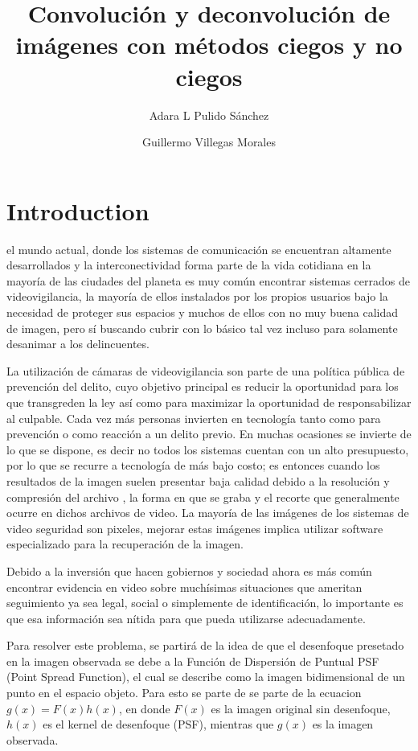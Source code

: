 \documentclass[eng]{ajceam-class}
\title{Convolución y deconvolución de imágenes con métodos ciegos y no ciegos}
\author[1]{Adara L Pulido Sánchez}
\author[2]{Guillermo Villegas Morales}
\affil[1]{Tecnologico de Monterrey, Escuela de Ingenieria y Ciencias}
\begin{document}
\maketitle
\thispagestyle{fancy}


\section{Introduction}
el mundo actual, donde los sistemas de comunicación se encuentran altamente desarrollados y la interconectividad forma parte de la vida cotidiana en la mayoría de las ciudades del planeta es muy común encontrar sistemas cerrados de videovigilancia, la mayoría  de ellos instalados por los propios usuarios bajo la necesidad de proteger sus espacios y muchos de ellos con no muy buena calidad de imagen, pero sí buscando cubrir con lo básico tal vez incluso para solamente desanimar a los delincuentes.

 La utilización de cámaras de videovigilancia son parte de una política pública de prevención del delito, cuyo objetivo principal es reducir la oportunidad para los que transgreden la ley así como para maximizar la oportunidad de responsabilizar al culpable. 
 Cada vez más personas invierten en tecnología tanto como para prevención o como reacción a un delito previo. En muchas ocasiones se invierte de lo que se dispone, es decir no todos los sistemas cuentan con un alto presupuesto, por lo que se recurre a tecnología de más bajo costo; es entonces cuando los resultados de la imagen suelen presentar baja calidad debido a la resolución y compresión del archivo , la forma en que se graba y el recorte que generalmente ocurre en dichos archivos de video. La mayoría de las imágenes de los sistemas de video seguridad son pixeles, mejorar estas  imágenes implica utilizar software especializado para la recuperación de la imagen. 

 Debido a la inversión que hacen gobiernos y sociedad  ahora es más común  encontrar evidencia en video sobre muchísimas situaciones que ameritan seguimiento ya sea legal, social o simplemente de identificación, lo importante es que esa información sea nítida para que pueda utilizarse adecuadamente.

 Para resolver este problema, se partirá de la idea de que el desenfoque presetado en la imagen observada se debe a la Función de Dispersión de Puntual PSF (Point Spread Function), el cual se describe como la imagen bidimensional de un punto en el espacio objeto. Para esto se parte de se parte de la ecuacion $g(x)=F(x)h(x)$, en donde $F(x)$ es la imagen original sin desenfoque, $h(x)$ es el kernel de desenfoque (PSF), mientras que $g(x)$ es la imagen observada. 
 
\end{document}
